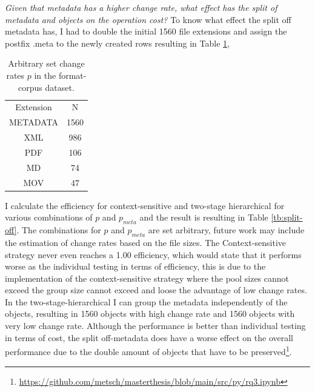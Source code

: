 \documentclass[final]{vutinfth}
\begin{document}
\textit{Given that metadata has a higher change rate, what effect has the split of metadata and objects on the operation cost?}
To know what effect the split off metadata has, I had to double the initial 1560 file extensions and assign the postfix .meta to the newly created rows resulting in Table \ref{tb:metadata},
\begin{table}[t]
    \centering
    \begin{tabular}{c c}
        Extension & N \\
        METADATA & 1560 \\
        XML& 986 \\
        PDF& 106  \\
        MD& 74  \\
        MOV& 47  
    \end{tabular}
    \caption{Arbitrary set change rates $p$ in the format-corpus dataset.}
    \label{tb:metadata}
\end{table}
I calculate the efficiency for context-sensitive and two-stage hierarchical for various combinations of $p$ and $p_{meta}$ and the result is resulting in Table \ref{tb:split-off}. The combinations for $p$ and $p_{meta}$ are set arbitrary, future work may include the estimation of change rates based on the file sizes.
The Context-sensitive strategy never even reaches a 1.00 efficiency, which would state that it performs worse as the individual testing in terms of efficiency, this is due to the implementation of the context-sensitive strategy where the pool sizes cannot exceed the group size cannot exceed and loose the advantage of low change rates. In the two-stage-hierarchical I can group the metadata independently of the objects, resulting in 1560 objects with high change rate and 1560 objects with very low change rate. Although the performance is better than individual testing in terms of cost, the split off-metadata does have a worse effect on the overall performance due to the double amount of objects that have to be preserved\footnote{\url{https://github.com/metsch/masterthesis/blob/main/src/py/rq3.ipynb}}.
\end{document}
